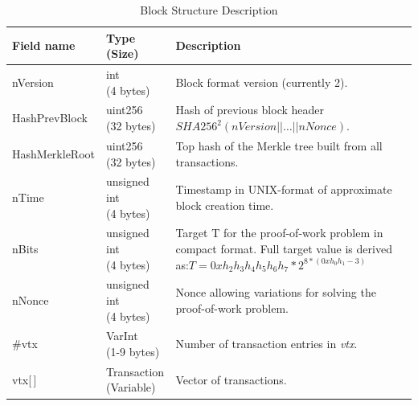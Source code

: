 \begin{table}[ht!]
	\begin{tabularx}{\textwidth}{ | m{70pt} | >{\centering} m{60pt} | X |}

		\hline
		\textbf{Field name} &
		\bigcell{c}{\textbf{Type} \\ \textbf{(Size)}} &
		\textbf{Description}\\ \hline\hline
    
		nVersion &
		\bigcell{c}{int \\ (4 bytes)} &
		Block format version (currently 2). \\ \hline
		
		HashPrevBlock &
		\bigcell{c}{uint256 \\ (32 bytes)} &
		Hash of previous block header \newline
		$SHA256^{2}(nVersion || \dots || nNonce)$. \\ \hline
	
		HashMerkleRoot &
		\bigcell{c}{uint256 \\ (32 bytes)} &
		Top hash of the Merkle tree built from all transactions. \\ \hline
		
		nTime &
		\bigcell{c}{unsigned int \\ (4 bytes)} &
		Timestamp in UNIX-format of approximate block creation time. \\ \hline
	
		nBits &
		\bigcell{c}{unsigned int \\ (4 bytes)} &
		Target T for the proof-of-work problem in compact format. Full target value is derived as:\newline$T = 0xh_{2}h_{3}h_{4}h_{5}h_{6}h_{7} * 2^{8*(0xh_{0}h_{1} - 3)}$\\ \hline
	
		nNonce &
		\bigcell{c}{unsigned int \\ (4 bytes)} &
		Nonce allowing variations for solving the proof-of-work problem.\\ \hline
	
		\#vtx &
		\bigcell{c}{VarInt \\ (1-9 bytes)} &
		Number of transaction entries in \textit{vtx}. \\ \hline
	
		vtx[\,] &
		\bigcell{c}{Transaction \\ (Variable)} &
		Vector of transactions. \\ \hline
	\end{tabularx}
	\vspace{5pt}
	\caption{Block Structure Description}
	\label{table:CBlock}
\end{table}

